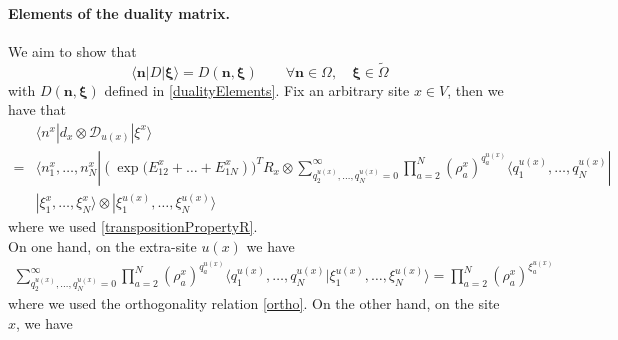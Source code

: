 \documentclass[10pt]{article}
\numberwithin{equation}{section}
\numberwithin{equation}{subsection}
\newcommand{\dd}{\mathcal{D}_{u(x)}}
\begin{document}
\paragraph{Elements of the duality matrix.}We aim to show that 
\begin{equation}\label{proofDualityElements}
\langle \bm{n}|D|\bm{\xi}\rangle=D(\bm{n},\bm{\xi})\qquad   \forall \bm{n}\in \Omega,\quad \bm{\xi}\in \widetilde{\Omega}
\end{equation}
with $D(\bm{n},\bm{\xi})$ defined in \eqref{dualityElements}. 
Fix an arbitrary site $x\in V$, then we have that 
\begin{align*}
	 &\langle n^{x}|d_{x}\otimes \dd|\xi^{x}\rangle\\=&\langle n_{1}^{x},\ldots,n_{N}^{x}| (\exp{(E_{12}^{x}+\ldots+E_{1N}^{x}}))^{T}R_{x}\otimes\sum_{q_{2}^{u(x)},\ldots,q_{N}^{u(x)}=0}^{\infty}\prod_{a=2}^{N}\left(\rho_{a}^{x}\right)^{q_{a}^{u(x)}}\langle q_{1}^{u(x)},\ldots,q_{N}^{u(x)}|
	 \\&|\xi_{1}^{x},\ldots,\xi_{N}^{x}\rangle \otimes |\xi_{1}^{u(x)},\ldots,\xi_{N}^{u(x)}\rangle
\end{align*}
where we used \eqref{transpositionPropertyR}. \\
On one hand, on the extra-site $u(x)$ we have 
\begin{align*}
\sum_{q_{2}^{u(x)},\ldots,q_{N}^{u(x)}=0}^{\infty}\prod_{a=2}^{N}\left(\rho_{a}^{x}\right)^{q_{a}^{u(x)}}\langle q_{1}^{u(x)},\ldots,q_{N}^{u(x)}|\xi_{1}^{u(x)},\ldots,\xi_{N}^{u(x)}\rangle=\prod_{a=2}^{N}\left(\rho_{a}^{x}\right)^{\xi_{a}^{u(x)}}
\end{align*}
where we used the orthogonality relation \eqref{ortho}. 
On the other hand, on the site $x$, we have 
\end{document}

